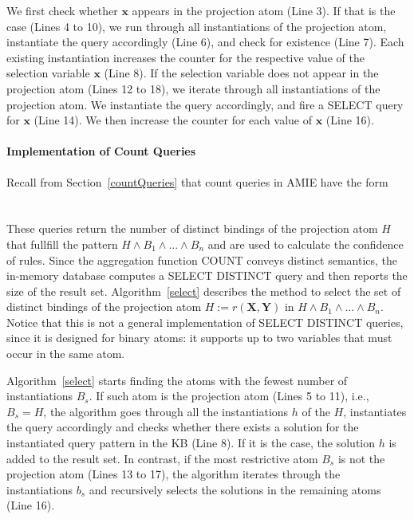 We first check whether $\bm{x}$ appears in the projection atom (Line 3).
If that is the case (Lines 4 to 10), we run through all instantiations of the projection atom, instantiate the query accordingly (Line 6), and check for existence (Line 7).
Each existing instantiation increases the counter for the respective value of the selection variable $\bm{x}$ (Line 8). 
If the selection variable does not appear in the projection atom (Lines 12 to 18), 
we iterate through all instantiations of the projection atom.
We instantiate the query accordingly, and fire a SELECT query for $\bm{x}$ (Line 14). 
We then increase the counter for each value of $\bm{x}$ (Line 16).

\paragraph{Implementation of Count Queries} Recall from Section~\ref{countQueries} that count queries in AMIE have the form \\ \\
 \\

These queries return the number of distinct bindings of the projection atom $H$ 
that fullfill the pattern $H \wedge B_1 \wedge ... \wedge B_n$ and are used to
calculate the confidence of rules. Since the aggregation function COUNT conveys
distinct semantics, the in-memory database computes a SELECT DISTINCT query 
and then reports the size of the result set. Algorithm~\ref{select} describes
the method to select the set of distinct bindings of the projection atom $H := r(\bm{X}, \bm{Y})$ in
$H \wedge B_1 \wedge ... \wedge B_n$. Notice that this is not a general implementation of SELECT DISTINCT queries,
since it is designed for binary atoms: it supports up to two variables that must occur in the same atom.

Algorithm~\ref{select} starts finding the atoms with the fewest number of instantiations $B_s$. If such atom is the
projection atom (Lines 5 to 11), i.e., $B_s = H$, the algorithm goes through all the instantiations $h$ of the $H$, instantiates
the query accordingly and checks whether there exists a solution for the instantiated query pattern in the KB (Line 8). 
If it is the case, the solution $h$ is added to the result set. In contrast, if the most restrictive atom $B_s$ is not 
the projection atom (Lines 13 to 17), the algorithm iterates through the instantiations $b_s$ and recursively 
selects the solutions in the remaining atoms (Line 16).

